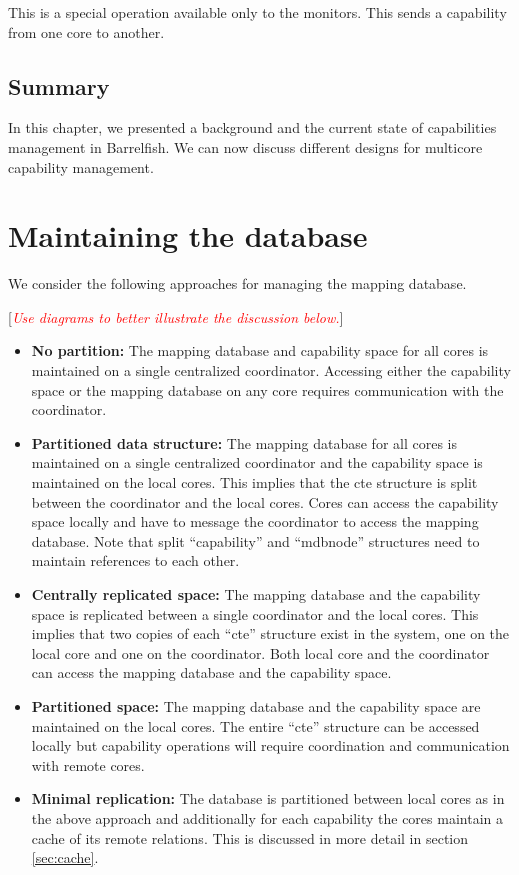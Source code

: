 \documentclass[a4paper,twoside]{report} %
\newcommand{\note}[1]{[\textcolor{red}{\textit{#1}}]}
\begin{document}
This is a special operation available only to the monitors. This sends
a capability from one core to another.

\section{Summary}

In this chapter, we presented a background and the current state of
capabilities management in Barrelfish. We can now discuss different
designs for multicore capability management.



\chapter{Maintaining the database}\label{chap:db}
We consider the following approaches for managing the mapping
database.

\note{Use diagrams to better illustrate the discussion below.}

\begin{itemize}
\item \textbf{No partition:} The mapping database and capability space
  for all cores is maintained on a single centralized
  coordinator. Accessing either the capability space or the mapping
  database on any core requires communication with the coordinator.

\item \textbf{Partitioned data structure:} The mapping database for
  all cores is maintained on a single centralized coordinator and the
  capability space is maintained on the local cores. This implies that
  the cte structure is split between the coordinator and the local
  cores. Cores can access the capability space locally and have to
  message the coordinator to access the mapping database. Note that
  split ``capability'' and ``mdbnode'' structures need to maintain
  references to each other.

\item \textbf{Centrally replicated space:} The mapping database and
  the capability space is replicated between a single coordinator and
  the local cores. This implies that two copies of each ``cte''
  structure exist in the system, one on the local core and one on the
  coordinator. Both local core and the coordinator can access the
  mapping database and the capability space.

\item \textbf{Partitioned space:} The mapping database and the
  capability space are maintained on the local cores. The entire
  ``cte'' structure can be accessed locally but capability operations
  will require coordination and communication with remote cores.

\item \textbf{Minimal replication:} The database is partitioned
  between local cores as in the above approach and additionally for
  each capability the cores maintain a cache of its remote relations.
  This is discussed in more detail in section \ref{sec:cache}.
\end{itemize}
\end{document}
